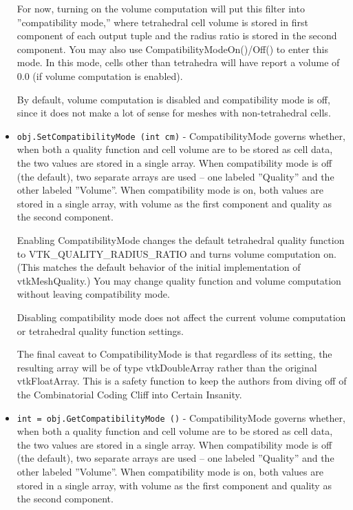 \begin{itemize}
 For now, turning on the volume computation will put this
 filter into ''compatibility mode,'' where tetrahedral cell
 volume is stored in first component of each output tuple and
 the radius ratio is stored in the second component. You may
 also use CompatibilityModeOn()/Off() to enter this mode.
 In this mode, cells other than tetrahedra will have report
 a volume of 0.0 (if volume computation is enabled).

 By default, volume computation is disabled and compatibility
 mode is off, since it does not make a lot of sense for
 meshes with non-tetrahedral cells.

\item  \verb|obj.SetCompatibilityMode (int cm)| -  CompatibilityMode governs whether, when both a quality function
 and cell volume are to be stored as cell data, the two values
 are stored in a single array. When compatibility mode is off
 (the default), two separate arrays are used -- one labeled
 ''Quality'' and the other labeled ''Volume''.
 When compatibility mode is on, both values are stored in a
 single array, with volume as the first component and quality
 as the second component.

 Enabling CompatibilityMode changes the default tetrahedral
 quality function to VTK\_QUALITY\_RADIUS\_RATIO and turns volume
 computation on. (This matches the default behavior of the
 initial implementation of vtkMeshQuality.) You may change
 quality function and volume computation without leaving
 compatibility mode.

 Disabling compatibility mode does not affect the current
 volume computation or tetrahedral quality function settings. 

 The final caveat to CompatibilityMode is that regardless of
 its setting, the resulting array will be of type vtkDoubleArray
 rather than the original vtkFloatArray.
 This is a safety function to keep the authors from
 diving off of the Combinatorial Coding Cliff into
 Certain Insanity.

\item  \verb|int = obj.GetCompatibilityMode ()| -  CompatibilityMode governs whether, when both a quality function
 and cell volume are to be stored as cell data, the two values
 are stored in a single array. When compatibility mode is off
 (the default), two separate arrays are used -- one labeled
 ''Quality'' and the other labeled ''Volume''.
 When compatibility mode is on, both values are stored in a
 single array, with volume as the first component and quality
 as the second component.


\end{itemize}
